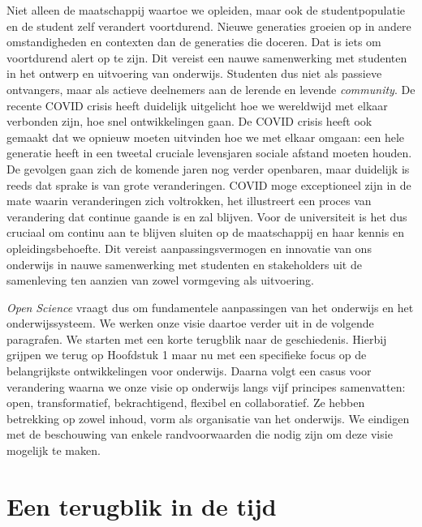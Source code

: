 \documentclass[smallauthor, chapterhaspagenum, nochapterinheader, pagenuminheader,  bigchapnum,medium2, tocpages,  garamond, titleinheader]{jote-book}
\begin{document}
	Niet alleen de maatschappij waartoe we opleiden, maar ook de studentpopulatie en de student zelf verandert voortdurend. Nieuwe generaties groeien op in andere omstandigheden en contexten dan de generaties die doceren. Dat is iets om voortdurend alert op te zijn. Dit vereist een nauwe samenwerking met studenten in het ontwerp en uitvoering van onderwijs. Studenten dus niet als passieve ontvangers, maar als actieve deelnemers aan de lerende en levende \emph{community}. De recente COVID crisis heeft duidelijk uitgelicht hoe we wereldwijd met elkaar verbonden zijn, hoe snel ontwikkelingen gaan. De COVID crisis heeft ook gemaakt dat we opnieuw moeten uitvinden hoe we met elkaar omgaan: een hele generatie heeft in een tweetal cruciale levensjaren sociale afstand moeten houden. De gevolgen gaan zich de komende jaren nog verder openbaren, maar duidelijk is reeds dat sprake is van grote veranderingen. COVID moge exceptioneel zijn in de mate waarin veranderingen zich voltrokken, het illustreert een proces van verandering dat continue gaande is en zal blijven. Voor de universiteit is het dus cruciaal om continu aan te blijven sluiten op de maatschappij en haar kennis en opleidingsbehoefte. Dit vereist aanpassingsvermogen en innovatie van ons onderwijs in nauwe samenwerking met studenten en stakeholders uit de samenleving ten aanzien van zowel vormgeving als uitvoering.



	\emph{Open }\emph{Science} vraagt dus om fundamentele aanpassingen van het onderwijs en het onderwijssysteem. We werken onze visie daartoe verder uit in de volgende paragrafen. We starten met een korte terugblik naar de geschiedenis. Hierbij grijpen we terug op Hoofdstuk 1 maar nu met een specifieke focus op de belangrijkste ontwikkelingen voor onderwijs. Daarna volgt een casus voor verandering waarna we onze visie op onderwijs langs vijf principes samenvatten: open, transformatief, bekrachtigend, flexibel en collaboratief. Ze hebben betrekking op zowel inhoud, vorm als organisatie van het onderwijs. We eindigen met de beschouwing van enkele randvoorwaarden die nodig zijn om deze visie mogelijk te maken.



	\section{Een terugblik in de tijd}
\end{document}
